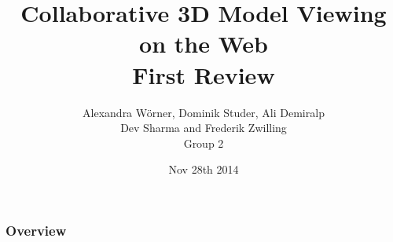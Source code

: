 

\title[Collaborative 3D Model Viewing on the Web]{Collaborative 3D Model Viewing on the Web\\ First Review}
\author[Group 2]{%
  Alexandra Wörner, Dominik Studer, Ali Demiralp\\ Dev Sharma and Frederik Zwilling \\
  \bigskip
  {\scriptsize Group 2}
}

\date[Nov 28th 2014 @ HENM 2014]{Nov 28th 2014}



\frame[plain]{\titlepage}
\addtocounter{framenumber}{-1}

\begin{frame}
  \frametitle{Overview}
  \tableofcontents[hideallsubsections]
\end{frame}





